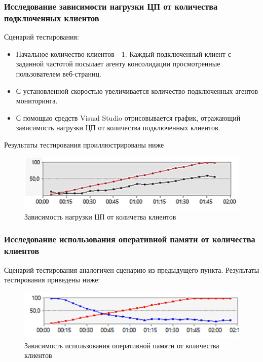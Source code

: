 \documentclass[russian, utf8, emptystyle]{eskdtext}
\begin{document}
\subsubsection {Исследование зависимости нагрузки ЦП от количества подключенных клиентов}

Сценарий тестирования:
\begin{itemize}
	\item Начальное количество клиентов - 1. Каждый подключенный клиент с заданной частотой посылает агенту консолидации просмотренные пользователем веб-страниц.
	\item С установленной скоростью увеличивается количество подключенных агентов мониторинга.
	\item С помощью средств Visual Studio отрисовывается график, отражающий зависимость нагрузки ЦП от количества подключенных клиентов.
\end{itemize}

Результаты тестирования проиллюстрированы ниже
 \begin{figure}[h]
 	\begin{center}
 		\includegraphics[width=12cm]{pic/test1.png}
 		\caption{Зависимость нагрузки ЦП от количетва клиентов}
 		\label{fig:low_sigma}
 	\end{center}
 \end{figure}
 
\subsubsection{Исследование использования оперативной памяти от количества клиентов}

Сценарий тестирования аналогичен сценарию из предыдущего пункта.
Результаты тестирования приведены ниже:
\begin{figure}[h]
	\begin{center}
		\includegraphics[width=12cm]{pic/test2.png}
		\caption{Зависимость использования оперативной памяти от количества клиентов}
		\label{fig:low_sigma}
	\end{center}
\end{figure}
\end{document}
